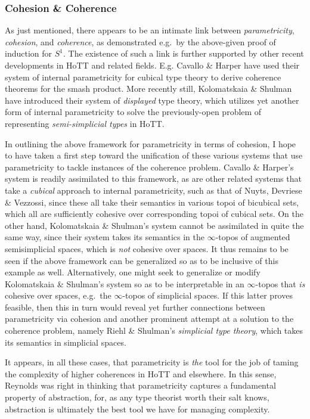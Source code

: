 \documentclass[
  12pt]{article}
\begin{document}
\subsubsection{Cohesion \& Coherence}\label{cohesion-coherence}

As just mentioned, there appears to be an intimate link between
\emph{parametricity}, \emph{cohesion}, and \emph{coherence}, as
demonstrated e.g.~by the above-given proof of induction for \(S^1\). The
existence of such a link is further supported by other recent
developments in HoTT and related fields. E.g. Cavallo \& Harper have
used their system of internal parametricity for cubical type theory to
derive coherence theorems for the smash product. More recently still,
Kolomatskaia \& Shulman have introduced their system of \emph{displayed}
type theory, which utilizes yet another form of internal parametricity
to solve the previously-open problem of representing
\emph{semi-simplicial types} in HoTT.

In outlining the above framework for parametricity in terms of cohesion,
I hope to have taken a first step toward the unification of these
various systems that use parametricity to tackle instances of the
coherence problem. Cavallo \& Harper's system is readily assimilated to
this framework, as are other related systems that take a \emph{cubical}
approach to internal parametricity, such as that of Nuyts, Devriese \&
Vezzossi, since these all take their semantics in various topoi of
bicubical sets, which all are sufficiently cohesive over corresponding
topoi of cubical sets. On the other hand, Kolomatskaia \& Shulman's
system cannot be assimilated in quite the same way, since their system
takes its semantics in the \(\infty\)-topos of augmented semisimplicial
spaces, which is \emph{not} cohesive over spaces. It thus remains to be
seen if the above framework can be generalized so as to be inclusive of
this example as well. Alternatively, one might seek to generalize or
modify Kolomatskaia \& Shulman's system so as to be interpretable in an
\(\infty\)-topos that \emph{is} cohesive over spaces, e.g.~the
\(\infty\)-topos of simplicial spaces. If this latter proves feasible,
then this in turn would reveal yet further connections between
parametricity via cohesion and another prominent attempt at a solution
to the coherence problem, namely Riehl \& Shulman's \emph{simplicial
type theory}, which takes its semantics in simplicial spaces.

It appears, in all these cases, that parametricity is \emph{the} tool
for the job of taming the complexity of higher coherences in HoTT and
elsewhere. In this sense, Reynolds was right in thinking that
parametricity captures a fundamental property of abstraction, for, as
any type theorist worth their salt knows, abstraction is ultimately the
best tool we have for managing complexity.
\end{document}
